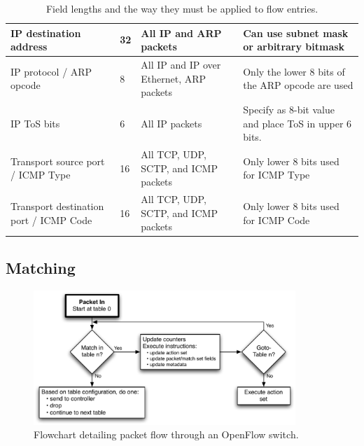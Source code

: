 \documentclass[10pt]{article}
\begin{document}
\begin{table}[hbp]
\begin{tabularx}{\textwidth}{ |X|X|X|X| }
\hline IP destination address & 32 & All IP and ARP packets & Can use subnet mask or arbitrary bitmask \\
\hline IP protocol / ARP opcode & 8 & All IP and IP over Ethernet, ARP packets & Only the lower 8 bits of the ARP opcode are used \\
\hline IP ToS bits & 6 & All IP packets & Specify as 8-bit value and place ToS in upper 6 bits. \\
\hline Transport source port / ICMP Type & 16 & All TCP, UDP, SCTP, and ICMP packets & Only lower 8 bits used for ICMP Type \\
\hline Transport destination port / ICMP Code & 16 & All TCP, UDP, SCTP, and ICMP packets & Only lower 8 bits used for ICMP Code \\
\hline
\end{tabularx}
\caption{Field lengths and the way they must be applied to flow entries.}
\label{table:header field details}
\end{table}

\subsection{Matching}
\label{sec:matching}
\begin{figure}[!htb]
\centering
\includegraphics[height=2.0in]{packet_flow_flowchart}
\caption{Flowchart detailing packet flow through an OpenFlow switch.}
\label{fig:packet_flow}
\end{figure}
\end{document}
